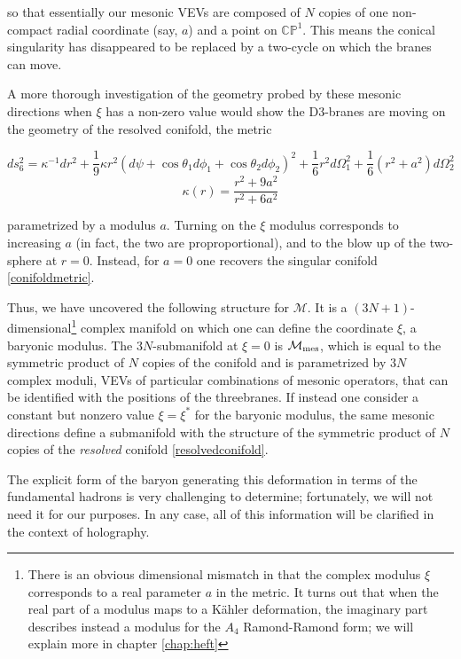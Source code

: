so that essentially our mesonic VEVs are composed of $N$ copies of one non-compact radial coordinate (say, $a$) and a point on $\mathbb{CP}^1$. This means the conical singularity has disappeared to be replaced by a two-cycle on which the branes can move.

A more thorough investigation of the geometry probed by these mesonic directions when $\xi$ has a non-zero value would show the D3-branes are moving on the geometry of the resolved conifold, the metric\cite{PandoZayas}

\begin{equation}
	ds_6^2 = \kappa^{-1} dr^2 + \frac{1}{9} \kappa r^2 (d\psi + \cos\theta_1 d\phi_1 + \cos\theta_2 d\phi_2)^2 + \frac{1}{6} r^2 d\Omega_1^2 + \frac{1}{6} (r^2 + a^2 ) d\Omega_2^2\label{resolvedconifold}
\end{equation}
\begin{equation}
	\kappa(r) = \frac{r^2 + 9a^2}{r^2 + 6a^2}
	\label{}
\end{equation}

parametrized by a modulus $a$. Turning on the $\xi$ modulus corresponds to increasing $a$ (in fact, the two are proproportional\cite{MZ}), and to the blow up of the two-sphere at $r=0$. Instead, for $a=0$ one recovers the singular conifold \eqref{conifoldmetric}.

Thus, we have uncovered the following structure for $\mathcal{M}$. It is a $(3N + 1)$-dimensional\footnote{There is an obvious dimensional mismatch in that the complex modulus $\xi$ corresponds to a real parameter $a$ in the metric. It turns out that when the real part of a modulus maps to a K\"ahler deformation, the imaginary part describes instead a modulus for the $A_4$ Ramond-Ramond form; we will explain more in chapter \ref{chap:heft}} complex manifold on which one can define the coordinate $\xi$, a baryonic modulus. The $3N$-submanifold at $\xi = 0$ is $\mathcal{M}_\mathrm{mes}$, which is equal to the symmetric product of $N$ copies of the conifold and is parametrized by $3N$ complex moduli, VEVs of particular combinations of mesonic operators, that can be identified with the positions of the threebranes. If instead one consider a constant but nonzero value $\xi = \xi^*$ for the baryonic modulus, the same mesonic directions define a submanifold with the structure of the symmetric product of $N$ copies of the \emph{resolved} conifold \eqref{resolvedconifold}.

The explicit form of the baryon generating this deformation in terms of the fundamental hadrons is very challenging to determine\cite{Forcella}; fortunately, we will not need it for our purposes. In any case, all of this information will be clarified in the context of holography.



